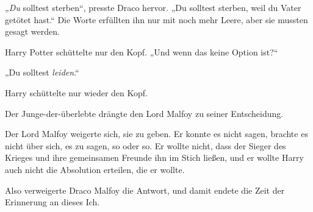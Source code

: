 \emph{„Du} solltest sterben“, presste Draco hervor.
„Du solltest sterben, weil du Vater getötet hast.“ Die Worte erfüllten ihn nur mit noch mehr Leere, aber sie mussten gesagt werden.

Harry Potter schüttelte nur den Kopf.
„Und wenn das keine Option ist?“

„Du solltest \emph{leiden}.“

Harry schüttelte nur wieder den Kopf.

Der Junge-der-überlebte drängte den Lord Malfoy zu seiner Entscheidung.

Der Lord Malfoy weigerte sich, sie zu geben. Er konnte es nicht sagen, brachte es nicht über sich, es zu sagen, so oder so. Er wollte nicht, dass der Sieger des Krieges und ihre gemeinsamen Freunde ihn im Stich ließen, und er wollte Harry auch nicht die Absolution erteilen, die er wollte.

Also verweigerte Draco Malfoy die Antwort, und damit endete die Zeit der Erinnerung an dieses Ich.

\later

